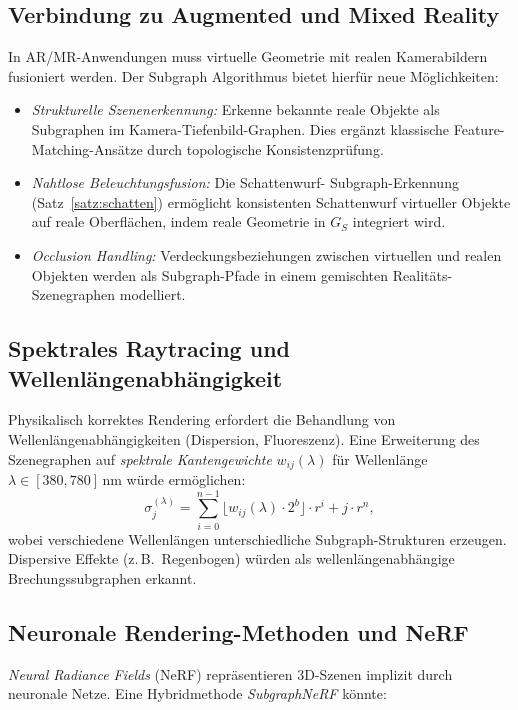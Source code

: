 ﻿\documentclass[a4paper,12pt]{article}
\theoremstyle{definition}
\begin{document}
\subsection{Verbindung zu Augmented und Mixed Reality}

In AR/MR-Anwendungen muss virtuelle Geometrie mit realen
Kamerabildern fusioniert werden. Der Subgraph Algorithmus bietet
hierfür neue Möglichkeiten:

\begin{itemize}
  \item \emph{Strukturelle Szenenerkennung:} Erkenne bekannte reale
        Objekte als Subgraphen im Kamera-Tiefenbild-Graphen.
        Dies ergänzt klassische Feature-Matching-Ansätze durch
        topologische Konsistenzprüfung.
  \item \emph{Nahtlose Beleuchtungsfusion:} Die Schattenwurf-
        Subgraph-Erkennung (Satz~\ref{satz:schatten}) ermöglicht
        konsistenten Schattenwurf virtueller Objekte auf
        reale Oberflächen, indem reale Geometrie in $G_S$
        integriert wird.
  \item \emph{Occlusion Handling:} Verdeckungsbeziehungen zwischen
        virtuellen und realen Objekten werden als
        Subgraph-Pfade in einem gemischten Realitäts-Szenegraphen
        modelliert.
\end{itemize}

\subsection{Spektrales Raytracing und Wellenlängenabhängigkeit}

Physikalisch korrektes Rendering erfordert die Behandlung von
Wellenlängenabhängigkeiten (Dispersion, Fluoreszenz). Eine
Erweiterung des Szenegraphen auf \emph{spektrale Kantengewichte}
$w_{ij}(\lambda)$ für Wellenlänge $\lambda \in [380, 780]$\,nm
würde ermöglichen:
\[
  \sigma_j^{(\lambda)} = \sum_{i=0}^{n-1}
  \lfloor w_{ij}(\lambda) \cdot 2^b \rfloor \cdot r^i
  + j \cdot r^n,
\]
wobei verschiedene Wellenlängen unterschiedliche Subgraph-Strukturen
erzeugen. Dispersive Effekte (z.\,B.\ Regenbogen) würden als
wellenlängenabhängige Brechungssubgraphen erkannt.

\subsection{Neuronale Rendering-Methoden und NeRF}

\emph{Neural Radiance Fields} (NeRF) \citep{Mildenhall2020}
repräsentieren 3D-Szenen implizit durch neuronale Netze.
Eine Hybridmethode \emph{SubgraphNeRF} könnte:
\end{document}
